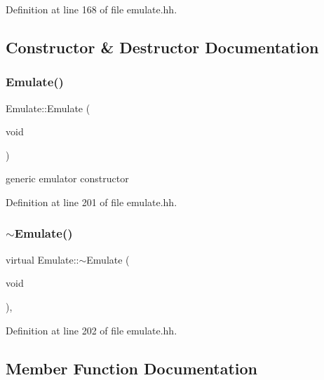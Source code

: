Definition at line 168 of file emulate.\+hh.



\subsection{Constructor \& Destructor Documentation}
\mbox{\label{class_emulate_a4a919329a32fae8f2f79fce47f258820}} 
\subsubsection{\texorpdfstring{Emulate()}{Emulate()}}
{\footnotesize\ttfamily Emulate\+::\+Emulate (\begin{DoxyParamCaption}\item[{void}]{ }\end{DoxyParamCaption})\hspace{0.3cm}{\ttfamily [inline]}}



generic emulator constructor 



Definition at line 201 of file emulate.\+hh.

\mbox{\label{class_emulate_a52e7fc26f81d2901acfbff828e77ddff}} 
\subsubsection{\texorpdfstring{$\sim$Emulate()}{~Emulate()}}
{\footnotesize\ttfamily virtual Emulate\+::$\sim$\+Emulate (\begin{DoxyParamCaption}\item[{void}]{ }\end{DoxyParamCaption})\hspace{0.3cm}{\ttfamily [inline]}, {\ttfamily [virtual]}}



Definition at line 202 of file emulate.\+hh.



\subsection{Member Function Documentation}
\mbox{\label{class_emulate_a278171740465666a64442716187a1505}} 
